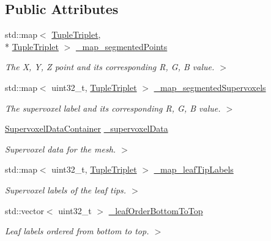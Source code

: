 \subsection*{Public Attributes}
\begin{DoxyCompactItemize}
\item 
std\-::map$<$ \hyperlink{tupleTriplet_8h_a0cdd11cd4d27abbb7b778a8fee3b2397}{Tuple\-Triplet}, \\*
\hyperlink{tupleTriplet_8h_a0cdd11cd4d27abbb7b778a8fee3b2397}{Tuple\-Triplet} $>$ \hyperlink{classPlantSegmentationDataContainer_a69cd3fc8af8419f86977a1a1cbd92dda}{\-\_\-map\-\_\-segmented\-Points}
\begin{DoxyCompactList}\small\item\em The X, Y, Z point and its corresponding R, G, B value. $>$ \end{DoxyCompactList}\item 
std\-::map$<$ uint32\-\_\-t, \hyperlink{tupleTriplet_8h_a0cdd11cd4d27abbb7b778a8fee3b2397}{Tuple\-Triplet} $>$ \hyperlink{classPlantSegmentationDataContainer_a593599986e0a17d7e94df9e7bbae9db2}{\-\_\-map\-\_\-segmented\-Supervoxels}
\begin{DoxyCompactList}\small\item\em The supervoxel label and its corresponding R, G, B value. $>$ \end{DoxyCompactList}\item 
\hyperlink{classSupervoxelDataContainer}{Supervoxel\-Data\-Container} \hyperlink{classPlantSegmentationDataContainer_a83b40592cb99a418ea689481425fc894}{\-\_\-supervoxel\-Data}
\begin{DoxyCompactList}\small\item\em Supervoxel data for the mesh. $>$ \end{DoxyCompactList}\item 
std\-::map$<$ uint32\-\_\-t, \hyperlink{tupleTriplet_8h_a0cdd11cd4d27abbb7b778a8fee3b2397}{Tuple\-Triplet} $>$ \hyperlink{classPlantSegmentationDataContainer_ad0a98dbe2681b9b3ee693b6c5b37e667}{\-\_\-map\-\_\-leaf\-Tip\-Labels}
\begin{DoxyCompactList}\small\item\em Supervoxel labels of the leaf tips. $>$ \end{DoxyCompactList}\item 
std\-::vector$<$ uint32\-\_\-t $>$ \hyperlink{classPlantSegmentationDataContainer_a6df4ddb8fefd98b15d007bd9fdb16413}{\-\_\-leaf\-Order\-Bottom\-To\-Top}
\begin{DoxyCompactList}\small\item\em Leaf labels ordered from bottom to top. $>$ \end{DoxyCompactList}\end{DoxyCompactItemize}


